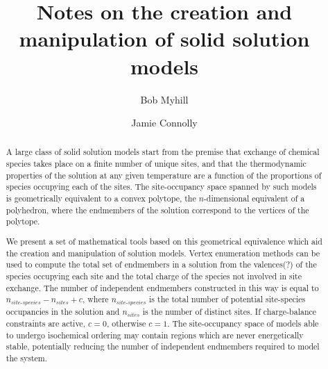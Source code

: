 \documentclass[preprint,12pt]{elsarticle}
\begin{document}
\begin{frontmatter}


\title{Notes on the creation and manipulation of solid solution models}




\author[bristol]{Bob Myhill}
\address[bristol]{School of Earth Sciences, University of Bristol}


\author[ethz]{Jamie Connolly}
\address[ethz]{Institut f\"{u}r Mineralogie und Petrographie ETH-Zentrum, Claussiusstrasse 25. CH-8092, Z\"{u}rich, Switzerland}

\begin{abstract}
A large class of solid solution models start from the premise that exchange of chemical species takes place on a finite number of unique sites, and that the thermodynamic properties of the solution at any given temperature are a function of the proportions of species occupying each of the sites. The site-occupancy space spanned by such models is geometrically equivalent to a convex polytope, the $n$-dimensional equivalent of a polyhedron, where the endmembers of the solution correspond to the vertices of the polytope.

We present a set of mathematical tools based on this geometrical equivalence which aid the creation and manipulation of solution models. Vertex enumeration methods can be used to compute the total set of endmembers in a solution from the valences(?) of the species occupying each site and the total charge of the species not involved in site exchange. The number of independent endmembers constructed in this way is equal to $n_{\textit{site-species}} - n_{\textit{sites}} + c$, where $n_{\textit{site-species}}$ is the total number of potential site-species occupancies in the solution and $n_{\textit{sites}}$ is the number of distinct sites. If charge-balance constraints are active, $c=0$, otherwise $c=1$. The site-occupancy space of models able to undergo isochemical ordering may contain regions which are never energetically stable, potentially reducing the number of independent endmembers required to model the system.


\end{abstract}
\end{frontmatter}
\end{document}
